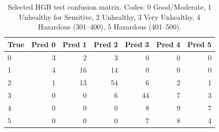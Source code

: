 \begin{table}[htbp]
\centering
\scriptsize
\caption{Selected HGB test confusion matrix. Codes: 0 Good/Moderate, 1 Unhealthy for Sensitive, 2 Unhealthy, 3 Very Unhealthy, 4 Hazardous (301--400), 5 Hazardous (401--500).}
\label{tab:clf-confusion}
\begin{tabular}{lrrrrrr}
\toprule
True & Pred 0 & Pred 1 & Pred 2 & Pred 3 & Pred 4 & Pred 5 \\
\midrule
0 & 3 & 2 & 3 & 0 & 0 & 0 \\
1 & 4 & 16 & 14 & 0 & 0 & 0 \\
2 & 1 & 13 & 54 & 6 & 2 & 1 \\
3 & 0 & 0 & 6 & 44 & 7 & 3 \\
4 & 0 & 0 & 0 & 8 & 9 & 7 \\
5 & 0 & 0 & 0 & 7 & 8 & 4 \\
\bottomrule
\end{tabular}

\end{table}
